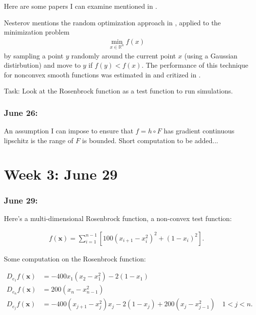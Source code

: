 \documentclass{article}
\begin{document}
Here are some papers I can examine mentioned in \cite{Nesterov2015}. \newline 


Nesterov mentions the random optimization approach in \cite{Matyas1965}, applied to the minimization problem 
\begin{align} \min_{x \in \mathbb{R}^n}f(x)  \end{align}
by sampling a point $y$ randomly around the current point $x$ (using a Gaussian distirbution)
 and move to $y$ if $f(y) < f(x)$. The performance of this technique for nonconvex smooth functions was estimated in \cite{dorea1983} and critized in \cite{sarma1990}. \newline 
 
Task: Look at the Rosenbrock function as a test function to run simulations.

\subsubsection{June 26:} 

An assumption I can impose to ensure that $f = h \circ F$ has gradient continuous lipschitz is the range of $F$ is bounded. Short computation to be added...

\section{Week 3: June 29}

\subsubsection{June 29:}

Here's a multi-dimensional Rosenbrock function, a non-convex test function:

\begin{align}
f(\mathbf{x}) = \sum_{i=1}^{n-1}\left[100(x_{i+1}-x_i^2)^2 + (1-x_i)^2\right].
\end{align}

Some computation on the Rosenbrock function:

\begin{align}
D_{e_1}f(\mathbf{x}) & = -400x_1(x_2-x_1^2) - 2(1-x_1) \\ D_{e_n}f(\mathbf{x}) & = 200(x_n - x_{n-1}^2) \\ D_{e_j}f(\mathbf{x}) & = -400(x_{j+1} - x_j^2)x_j - 2(1-x_j) + 200(x_j - x_{j-1}^2) \quad 1 < j < n.
\end{align}
\end{document}
